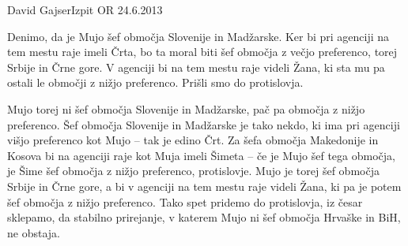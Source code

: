 \begin{naloga}{David Gajser}{Izpit OR 24.6.2013}
\begin{odgovor}
Denimo, da je Mujo šef območja Slovenije in Madžarske.
Ker bi pri agenciji na tem mestu raje imeli Črta,
bo ta moral biti šef območja z večjo preferenco, torej Srbije in Črne gore.
V agenciji bi na tem mestu raje videli Žana,
ki sta mu pa ostali le območji z nižjo preferenco.
Prišli smo do protislovja.

Mujo torej ni šef območja Slovenije in Madžarske,
pač pa območja z nižjo preferenco.
Šef območja Slovenije in Madžarske je tako nekdo,
ki ima pri agenciji višjo preferenco kot Mujo -- tak je edino Črt.
Za šefa območja Makedonije in Kosova bi na agenciji raje kot Muja imeli Šimeta
-- če je Mujo šef tega območja, je Šime šef območja z nižjo preferenco,
protislovje.
Mujo je torej šef območja Srbije in Črne gore,
a bi v agenciji na tem mestu raje videli Žana,
ki pa je potem šef območja z nižjo preferenco.
Tako spet pridemo do protislovja,
iz česar sklepamo, da stabilno prirejanje,
v katerem Mujo ni šef območja Hrvaške in BiH, ne obstaja.
\end{odgovor}
\end{naloga}
